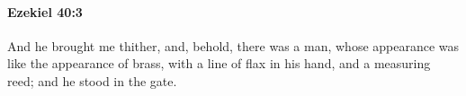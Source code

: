
		\paragraph{Ezekiel 40:3} %
			\label{EZEKIEL-40-3}

			And he brought me thither, and, behold, there was a man, whose appearance was like the appearance of brass, with a line of flax in his hand, and a measuring reed; and he stood in the gate.


